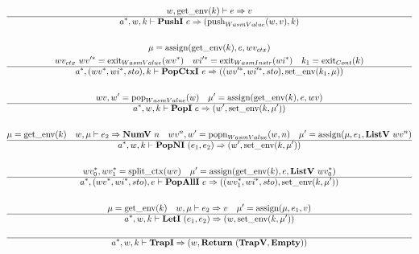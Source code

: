 \begin{gather*}
  w, \getenv(k) \vdash e \Rightarrow v \\
  \hline
  \seq{a}, w, k \vdash \pushi ~ e \Rightarrow (\push_{WasmValue}(w, v), k) \\
%
\newline \\
  \mu = \assign(\getenv(k), e, wv_{ctx}) \\
  wv_{ctx} ~ \seq{wv'} = \exit_{WasmValue}(\seq{wv}) \quad
  \seq{wi'} = \exit_{WasmInstr}(\seq{wi}) \quad
  k_1 = \exit_{Cont}(k) \\
  \hline
  \seq{a}, (\seq{wv}, \seq{wi}, sto), k \vdash \popctxi ~ e
  \Rightarrow
  ((\seq{wv'}, \seq{wi'}, sto), \setenv(k_1, \mu)) \\
%
\newline \\
  wv, w' = \pop_{WasmValue}(w) \quad
  \mu' = \assign(\getenv(k), e, wv) \\
  \hline
  \seq{a}, w, k \vdash \popi ~ e \Rightarrow (w', \setenv(k, \mu')) \\
%
\newline \\
  \mu = \getenv(k) \quad
  w, \mu \vdash e_2 \Rightarrow \numv ~ n \quad
  wv^n, w' = \popn_{WasmValue}(w, n) \quad
  \mu' = \assign(\mu, e_1, \listv ~ wv^n) \\
  \hline
  \seq{a}, w, k \vdash \popni ~ (e_1, e_2) \Rightarrow (w', \setenv(k, \mu')) \\
%
\newline \\
  \seq{wv_0}, \seq{wv_1} = \splitctx(wv) \quad
  \mu' = \assign(\getenv(k), e, \listv ~ \seq{wv_0}) \\
  \hline
  \seq{a}, (\seq{wv}, \seq{wi}, sto), e \vdash \popalli ~ e
  \Rightarrow
  ((\seq{wv_1}, \seq{wi}, sto), \setenv(k, \mu')) \\
%
\newline \\
  \mu = \getenv(k) \quad
  w, \mu \vdash e_2 \Rightarrow v \quad
  \mu' = \assign(\mu, e_1, v) \\
  \hline
  \seq{a}, w, k \vdash \leti ~ (e_1, e_2)
  \Rightarrow
  (w, \setenv(k, \mu')) \\
%
\newline \\
  \hline
  \seq{a}, w, k \vdash \trapi \Rightarrow (w, \ret ~ (\trapv, \mt)) \\
%
\newline \\

\end{gather*}
